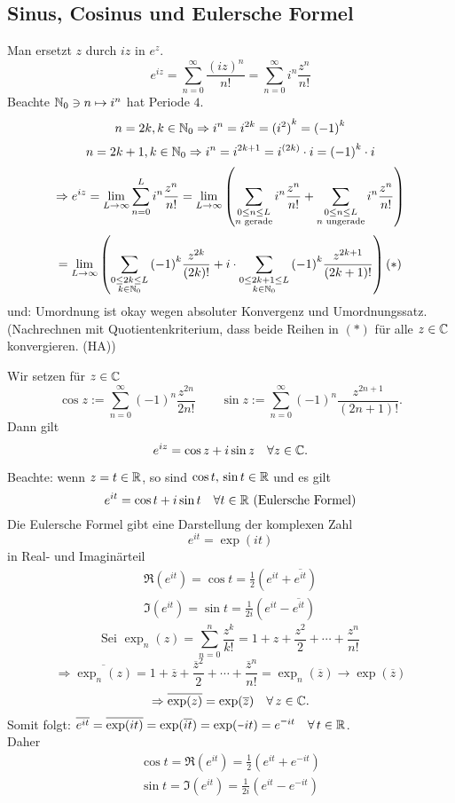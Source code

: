\documentclass[../ana1.tex]{subfiles}
\begin{document}
\subsection*{Sinus, Cosinus und Eulersche Formel}
Man ersetzt \( z \) durch \( iz \) in \( e^z \).
\[ e^{iz} = \sum_{n=0}^{\infty} \frac{{(iz)}^n}{n!} = \sum_{n=0}^{\infty} i^n \frac{z^n}{n!} \]
Beachte \( \mathbb{N}_0 \ni n \mapsto i^n \) hat Periode \( 4 \).
\[ n = 2k, k\in\mathbb{N}_0 \Rightarrow i^n = i^{2k} = {(i^2)}^k = {(-1)}^k \]
\[ n = 2k+1, k\in\mathbb{N}_0 \Rightarrow i^n = i^{2k+1} = i^{(2k)} \cdot i = {(-1)}^k \cdot i \]
\[ \Rightarrow e^{iz} = \lim\limits_{L\rightarrow\infty} \sum_{n=0}^L i^n \frac{z^n}{n!} = \lim\limits_{L\rightarrow\infty} \left( \sum_{\substack{0\leq n \leq L\\ n\text{ gerade}}} i^n \frac{z^n}{n!} + \sum_{\substack{0\leq n \leq L\\ n\text{ ungerade}}} i^n \frac{z^n}{n!} \right) \]
\[ = \lim\limits_{L\rightarrow\infty} \left( \sum_{\substack{0\leq 2k \leq L\\ k\in\mathbb{N}_0}} {(-1)}^k \frac{z^{2k}}{(2k)!} + i \cdot \sum_{\substack{0\leq 2k+1 \leq L\\ k\in\mathbb{N}_0 }} {(-1)}^k \frac{z^{2k+1}}{(2k+1)!} \right) (*) \]
und: Umordnung ist okay wegen absoluter Konvergenz und Umordnungssatz.\\
(Nachrechnen mit Quotientenkriterium, dass beide Reihen in \( (*) \) für alle \( z\in\mathbb{C} \) konvergieren. (HA))
\begin{defi}
    Wir setzen für \( z\in\mathbb{C} \)
    \[ \cos z := \sum_{n=0}^\infty {(-1)}^n \frac{z^{2n}}{2n!} \qquad \sin z  := \sum_{n=0}^\infty {(-1)}^n \frac{z^{2n+1}}{(2n+1)!}. \]
    Dann gilt
    \[ e^{iz} = \cos z + i \sin z \quad \forall z\in\mathbb{C}. \]
\end{defi}
\begin{prosa}
    Beachte: wenn \( z=t\in\mathbb{R} \), so sind \( \cos t,\, \sin t \in\mathbb{R} \) und es gilt
    \[ e^{it} = \cos t + i \sin t \quad \forall t\in\mathbb{R} \text{ (Eulersche Formel)} \]
    Die Eulersche Formel gibt eine Darstellung der komplexen Zahl
    \[ e^{it} = \exp(it) \]
    in Real- und Imaginärteil
    \begin{align*}
        \Re (e^{it}) = \cos t = \frac{1}{2} (e^{it} + \overline{e^{it}})\\
        \Im (e^{it}) = \sin t = \frac{1}{2i} (e^{it} - \overline{e^{it}})
    \end{align*}
    \[ \text{Sei } \exp_n (z) = \sum_{n=0}^n \frac{z^k}{k!} = 1 + z + \frac{z^2}{2} + \cdots + \frac{z^n}{n!} \]
    \[ \Rightarrow \overline{\exp_n(z)} = 1 + \overline{z} + \frac{ \overline{z}^2 }{2} + \cdots + \frac{ \overline{z}^n }{n!} = \exp_n (\overline{z}) \rightarrow \exp(\overline{z}) \]
    \[ \Rightarrow \overline{\exp(z)} = \exp(\overline{z}) \quad \forall \, z\in\mathbb{C}. \]
    Somit folgt: \( \overline{e^{it}} = \overline{\exp(it)} = \exp(\overline{it}) = \exp(\minus it) = e^{\minus i t} \quad \forall \, t\in\R \).\\
    Daher 
    \begin{align*}
        \cos t = \Re(e^{it}) = \frac{1}{2} \left( e^{it} + e^{\minus it} \right) \\
        \sin t = \Im(e^{it}) = \frac{1}{2i} \left( e^{it} - e^{\minus it} \right)
    \end{align*}
\end{prosa}
\end{document}
